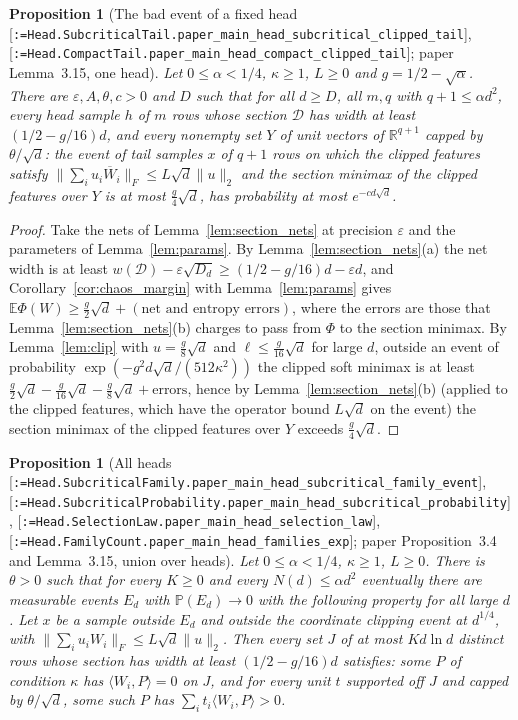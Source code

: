 \documentclass[11pt]{article}
\makeatletter
\newcommand{\formal@break}[1]{\@tfor\formal@tok:=#1\do{%
  \formal@tok
  \expandafter\ifx\formal@tok.\allowbreak\else
  \expandafter\ifx\formal@tok\_\allowbreak\fi\fi}}
\DeclareRobustCommand{\formal}[1]{\textnormal{[\texttt{\small\formal@break{#1}}]}}
\newcommand{\R}{\mathbb{R}}
\newcommand{\E}{\mathbb{E}}
\newcommand{\Prob}{\mathbb{P}}
\newcommand{\ip}[2]{\langle #1, #2\rangle}
\newcommand{\norm}[1]{\lVert #1\rVert}
\newcommand{\Fro}{F}
\newcommand{\sqd}{\sqrt{d}}
\newcommand{\Dd}{D}
\theoremstyle{plain}
\newtheorem{proposition}[theorem]{Proposition}
\theoremstyle{definition}
\makeatother
\begin{document}
\begin{proposition}[The bad event of a fixed head \formal{Head.SubcriticalTail.paper\_main\_head\_subcritical\_clipped\_tail}, \formal{Head.CompactTail.paper\_main\_head\_compact\_clipped\_tail}; paper Lemma~3.15, one head]\label{prop:fixed_head}
Let $0 \le \alpha < 1/4$, $\kappa \ge 1$, $L \ge 0$ and $g = 1/2 - \sqrt\alpha$.
There are $\varepsilon, A, \theta, c > 0$ and $D$ such that for all $d \ge D$,
all $m, q$ with $q + 1 \le \alpha d^2$, every head sample $h$ of $m$ rows whose
section $\mathcal{D}$ has width at least $(1/2 - g/16)d$, and every
nonempty set $Y$ of unit vectors of $\R^{q+1}$ capped by $\theta/\sqd$: the
event of tail samples $x$ of $q + 1$ rows on which the clipped features
satisfy $\norm{\sum_iu_i\overline W_i}_\Fro \le L\sqd\norm{u}_2$ and the
section minimax of the clipped features over $Y$ is at most $\frac g4\sqd$,
has probability at most $e^{-cd\sqd}$.
\end{proposition}

\begin{proof}
Take the nets of Lemma~\ref{lem:section_nets} at precision $\varepsilon$ and
the parameters of Lemma~\ref{lem:params}. By Lemma~\ref{lem:section_nets}(a)
the net width is at least $w(\mathcal{D}) - \varepsilon\sqrt{\Dd_d} \ge (1/2 - g/16)d - \varepsilon d$,
and Corollary~\ref{cor:chaos_margin} with Lemma~\ref{lem:params} gives
$\E\Phi(W) \ge \frac g2\sqd + (\text{net and entropy errors})$, where the
errors are those that Lemma~\ref{lem:section_nets}(b) charges to pass from
$\Phi$ to the section minimax. By Lemma~\ref{lem:clip} with $u = \frac g8\sqd$
and $\ell \le \frac g{16}\sqd$ for large $d$, outside an event of probability
$\exp(-g^2d\sqd/(512\kappa^2))$ the clipped soft minimax is at least
$\frac g2\sqd - \frac g{16}\sqd - \frac g8\sqd + \text{errors}$, hence by
Lemma~\ref{lem:section_nets}(b) (applied to the clipped features, which have
the operator bound $L\sqd$ on the event) the section minimax of the clipped
features over $Y$ exceeds $\frac g4\sqd$.
\end{proof}

\begin{proposition}[All heads \formal{Head.SubcriticalFamily.paper\_main\_head\_subcritical\_family\_event}, \formal{Head.SubcriticalProbability.paper\_main\_head\_subcritical\_probability}, \formal{Head.SelectionLaw.paper\_main\_head\_selection\_law}, \formal{Head.FamilyCount.paper\_main\_head\_families\_exp}; paper Proposition~3.4 and Lemma~3.15, union over heads]\label{prop:all_heads}
Let $0 \le \alpha < 1/4$, $\kappa \ge 1$, $L \ge 0$. There is $\theta > 0$
such that for every $K \ge 0$ and every $N(d) \le \alpha d^2$ eventually there
are measurable events $E_d$ with $\Prob(E_d) \to 0$ with the following
property for all large $d$. Let $x$ be a sample outside $E_d$ and outside the
coordinate clipping event at $d^{1/4}$, with $\norm{\sum_iu_iW_i}_\Fro \le L\sqd\norm{u}_2$.
Then every set $J$ of at most $Kd\ln d$ distinct rows whose section has
width at least $(1/2 - g/16)d$ satisfies: some $P$ of condition $\kappa$ has
$\ip{W_i}{P} = 0$ on $J$, and for every unit $t$ supported off $J$ and
capped by $\theta/\sqd$, some such $P$ has $\sum_it_i\ip{W_i}{P} > 0$.
\end{proposition}
\end{document}
